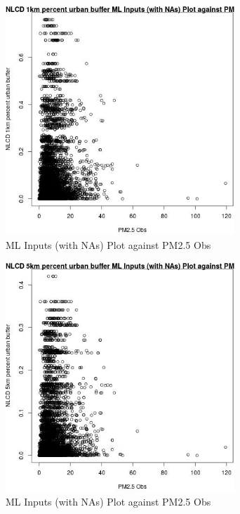 \begin{figure} 
\centering  
\includegraphics[width=0.77\textwidth]{Code_Outputs/Report_ML_input_PM25_Step4_part_e_de_duplicated_aves_compiled_2019-05-18wNAs_NLCD_1km_percent_urban_buffervPM25_Obs.jpg} 
\caption{\label{fig:Report_ML_input_PM25_Step4_part_e_de_duplicated_aves_compiled_2019-05-18wNAsNLCD_1km_percent_urban_buffervPM25_Obs}ML Inputs (with NAs) Plot against PM2.5 Obs} 
\end{figure} 
 

\begin{figure} 
\centering  
\includegraphics[width=0.77\textwidth]{Code_Outputs/Report_ML_input_PM25_Step4_part_e_de_duplicated_aves_compiled_2019-05-18wNAs_NLCD_5km_percent_urban_buffervPM25_Obs.jpg} 
\caption{\label{fig:Report_ML_input_PM25_Step4_part_e_de_duplicated_aves_compiled_2019-05-18wNAsNLCD_5km_percent_urban_buffervPM25_Obs}ML Inputs (with NAs) Plot against PM2.5 Obs} 
\end{figure} 
 

